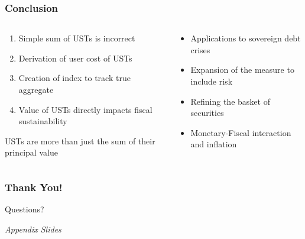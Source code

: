 \documentclass[11pt, handout, aspectratio=169]{beamer}
\newenvironment{wideitemize}{\itemize\addtolength{\itemsep}{10pt}}{\enditemize}
\begin{document}
\begin{frame}
\frametitle{Conclusion}
\begin{columns}[t]
	\begin{column}{.45\textwidth}
		\begin{wideitemize}
			\item {\bf \color{WeberPurple}{Contributions}}
			\begin{enumerate}
				\item Simple sum of USTs is incorrect
				\item Derivation of user cost of USTs
				\item Creation of index to track true aggregate
				\item Value of USTs directly impacts fiscal sustainability
			\end{enumerate}
			\item USTs are more than just the sum of their principal value
		\end{wideitemize}
	\end{column}
	\begin{column}{.55\textwidth}
		\begin{wideitemize}
			\item {\bf \color{WeberPurple}{Extensions}}
			\begin{itemize}
				\item Applications to sovereign debt crises
				\item Expansion of the measure to include risk
				\item Refining the basket of securities
				\item Monetary-Fiscal interaction and inflation
			\end{itemize}
		\end{wideitemize}
	\end{column}
\end{columns}
\end{frame}

\begin{frame}
	\frametitle{Thank You!}
	\begin{center}
		\LARGE \textcolor{WeberPurple}{Questions?}
	\end{center}
\end{frame}

\appendix
\setcounter{framenumber}{0}

\begin{frame}
	\begin{center}
		\LARGE \textcolor{WeberPurple}{\it Appendix Slides}
	\end{center}
\end{frame}
	
\end{document}
